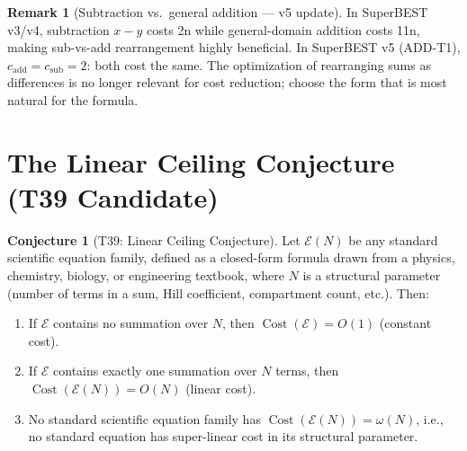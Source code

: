 \documentclass[12pt,a4paper]{article}
\theoremstyle{definition}
\newtheorem{conjecture}[theorem]{Conjecture}
\newtheorem{remark}[theorem]{Remark}
\newcommand{\Cost}{\operatorname{Cost}}
\begin{document}
\begin{remark}[Subtraction vs.\ general addition --- v5 update]
In SuperBEST v3/v4, subtraction $x - y$ costs 2n while general-domain addition
costs 11n, making sub-vs-add rearrangement highly beneficial.
In SuperBEST v5 (ADD-T1), $c_{\mathrm{add}} = c_{\mathrm{sub}} = 2$: both cost
the same.  The optimization of rearranging sums as differences is no longer
relevant for cost reduction; choose the form that is most natural for the
formula.
\end{remark}

\section{The Linear Ceiling Conjecture (T39 Candidate)}
\label{sec:conjecture}

\begin{conjecture}[T39: Linear Ceiling Conjecture]
\label{conj:T39}
Let $\mathcal{E}(N)$ be any standard scientific equation family,
defined as a closed-form formula drawn from a physics, chemistry,
biology, or engineering textbook, where $N$ is a structural parameter
(number of terms in a sum, Hill coefficient, compartment count, etc.).
Then:
\begin{enumerate}
  \item[\textup{(i)}] If $\mathcal{E}$ contains no summation over $N$,
        then $\Cost(\mathcal{E}) = O(1)$ (constant cost).
  \item[\textup{(ii)}] If $\mathcal{E}$ contains exactly one summation
        over $N$ terms, then $\Cost(\mathcal{E}(N)) = O(N)$ (linear cost).
  \item[\textup{(iii)}] No standard scientific equation family has
        $\Cost(\mathcal{E}(N)) = \omega(N)$, i.e., no standard equation
        has super-linear cost in its structural parameter.
\end{enumerate}
\end{conjecture}
\end{document}
